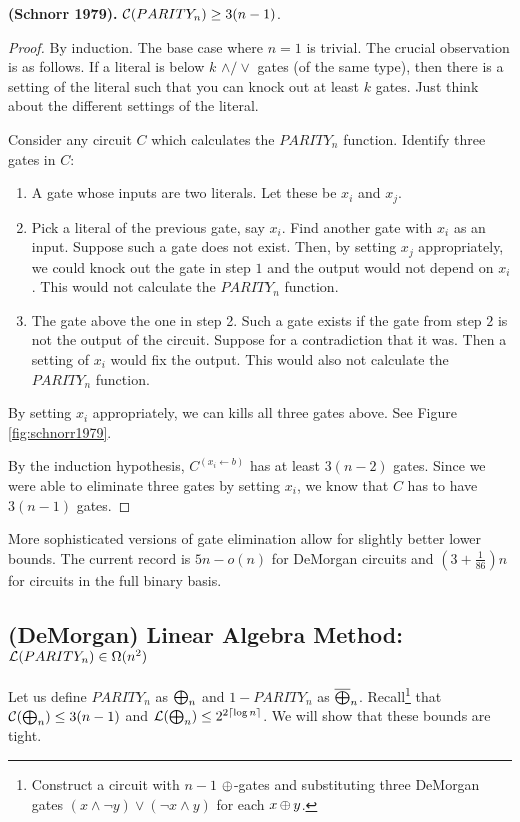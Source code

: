 \documentclass[11pt]{article}
\begin{document}
	\begin{theorem}
		\label{thm:schnorr1979-XORlb}
		\textbf{(Schnorr 1979).} $\mathcal{C}(PARITY_n) \geq 3(n-1)$.
	\end{theorem}
	\begin{proof}
		By induction. The base case where $n = 1$ is trivial. The crucial observation is as follows. If a literal is below $k$ $\land/\lor$ gates (of the same type), then there is a setting of the literal such that you can knock out at least $k$ gates. Just think about the different settings of the literal.
		
		Consider any circuit $C$ which calculates the $PARITY_n$ function. Identify three gates in $C$:
		\begin{enumerate}
			\item A gate whose inputs are two literals. Let these be $x_i$ and $x_j$. 
			\item Pick a literal of the previous gate, say $x_i$. Find another gate with $x_i$ as an input. Suppose such a gate does not exist. Then, by setting $x_j$ appropriately, we could knock out the gate in step $1$ and the output would not depend on $x_i$. This would not calculate the $PARITY_n$ function.
			\item The gate above the one in step 2. Such a gate exists if the gate from step $2$ is not the output of the circuit. Suppose for a contradiction that it was. Then a setting of $x_i$ would fix the output. This would also not calculate the $PARITY_n$ function.
		\end{enumerate}  
		By setting $x_i$ appropriately, we can kills all three gates above. See Figure \ref{fig:schnorr1979}.
		
		
		By the induction hypothesis, $C^{(x_i \leftarrow b)}$ has at least $3(n - 2)$ gates. Since we were able to eliminate three gates by setting $x_i$, we know that $C$ has to have $3(n-1)$ gates.  
	\end{proof}
	More sophisticated versions of gate elimination allow for slightly better lower bounds. The current record is $5n - o(n)$ for DeMorgan circuits and $\left(3 + \frac{1}{86}\right)n$ for circuits in the full binary basis. 
	\subsection{(DeMorgan) Linear Algebra Method: \texorpdfstring{$\mathcal{L}(PARITY_n) \in \Omega(n^2)$}{L(PARITYn) in Omega(n2)}}
	Let us define $PARITY_n$ as $\operatorname{\bigoplus}_n$ and $1 - PARITY_n$ as $\overline{\operatorname{\bigoplus}}_n$. Recall\footnote{Construct a circuit with $n-1$ $\operatorname{\oplus}$-gates and substituting three DeMorgan gates $(x \land \lnot y) \lor (\lnot x \land y)$ for each $x \operatorname{\oplus} y$.} that $\mathcal{C}(\operatorname{\bigoplus}_n) \leq 3(n-1)$ and $\mathcal{L}(\operatorname{\bigoplus}_n) \leq 2^{2\lceil\log n\rceil}$. We will show that these bounds are tight. 
	
\end{document}
